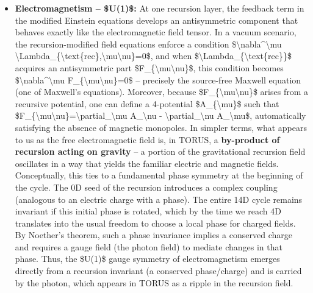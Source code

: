 \documentclass[
]{article}
\begin{document}
{\begin{itemize}
\item
  \textbf{Electromagnetism -- \$U(1)\$:} At one recursion layer, the
  feedback term in the modified Einstein equations develops an
  antisymmetric component that behaves exactly like the electromagnetic
  field tensor. In a vacuum scenario, the recursion-modified field
  equations enforce a condition
  \$\textbackslash nabla\^{}\textbackslash mu
  \textbackslash Lambda\_\{\textbackslash text\{rec\},\textbackslash mu\textbackslash nu\}=0\$,
  and when \$\textbackslash Lambda\_\{\textbackslash text\{rec\}\}\$
  acquires an antisymmetric part
  \$F\_\{\textbackslash mu\textbackslash nu\}\$, this condition becomes
  \$\textbackslash nabla\^{}\textbackslash mu
  F\_\{\textbackslash mu\textbackslash nu\}=0\$ -- precisely the
  source-free Maxwell equation (one of Maxwell's equations)\hspace{0pt}.
  Moreover, because \$F\_\{\textbackslash mu\textbackslash nu\}\$ arises
  from a recursive potential, one can define a 4-potential
  \$A\_\{\textbackslash mu\}\$ such that
  \$F\_\{\textbackslash mu\textbackslash nu\}=\textbackslash partial\_\textbackslash mu
  A\_\textbackslash nu - \textbackslash partial\_\textbackslash nu
  A\_\textbackslash mu\$, automatically satisfying the absence of
  magnetic monopoles\hspace{0pt}. In simpler terms, what appears to us
  as the free electromagnetic field is, in TORUS, a \textbf{by-product
  of recursion acting on gravity} -- a portion of the gravitational
  recursion field oscillates in a way that yields the familiar electric
  and magnetic fields\hspace{0pt}. Conceptually, this ties to a
  fundamental phase symmetry at the beginning of the cycle. The 0D seed
  of the recursion introduces a complex coupling (analogous to an
  electric charge with a phase). The entire 14D cycle remains invariant
  if this initial phase is rotated, which by the time we reach 4D
  translates into the usual freedom to choose a local phase for charged
  fields\hspace{0pt}. By Noether's theorem, such a phase invariance
  implies a conserved charge and requires a gauge field (the photon
  field) to mediate changes in that phase\hspace{0pt}. Thus, the
  \$U(1)\$ gauge symmetry of electromagnetism emerges directly from a
  recursion invariant (a conserved phase/charge) and is carried by the
  photon, which appears in TORUS as a ripple in the recursion field.

\end{itemize}}
\end{document}
